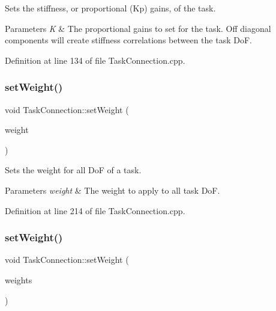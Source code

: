 Sets the stiffness, or proportional (Kp) gains, of the task. 
\begin{DoxyParams}{Parameters}
{\em K} & The proportional gains to set for the task. Off diagonal components will create stiffness correlations between the task DoF. \\
\hline
\end{DoxyParams}


Definition at line 134 of file Task\+Connection.\+cpp.

\hypertarget{classocra__recipes_1_1TaskConnection_ad833849636700c3174f305d10fcc00bf}{}\label{classocra__recipes_1_1TaskConnection_ad833849636700c3174f305d10fcc00bf} 
\subsubsection{\texorpdfstring{set\+Weight()}{setWeight()}\hspace{0.1cm}{\footnotesize\ttfamily [1/2]}}
{\footnotesize\ttfamily void Task\+Connection\+::set\+Weight (\begin{DoxyParamCaption}\item[{double}]{weight }\end{DoxyParamCaption})}

Sets the weight for all DoF of a task. 
\begin{DoxyParams}{Parameters}
{\em weight} & The weight to apply to all task DoF. \\
\hline
\end{DoxyParams}


Definition at line 214 of file Task\+Connection.\+cpp.

\hypertarget{classocra__recipes_1_1TaskConnection_ad03415eb9f2107be39cb44399fb0afd7}{}\label{classocra__recipes_1_1TaskConnection_ad03415eb9f2107be39cb44399fb0afd7} 
\subsubsection{\texorpdfstring{set\+Weight()}{setWeight()}\hspace{0.1cm}{\footnotesize\ttfamily [2/2]}}
{\footnotesize\ttfamily void Task\+Connection\+::set\+Weight (\begin{DoxyParamCaption}\item[{Eigen\+::\+Vector\+Xd \&}]{weights }\end{DoxyParamCaption})}


